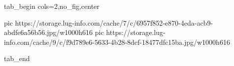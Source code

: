  
 
 
 
 


\ifcmt
  tab_begin cols=2,no_fig,center

     pic https://storage.lug-info.com/cache/7/c/6957f852-e870-4eda-acb9-abdfe6a56b56.jpg/w1000h616
		 pic https://storage.lug-info.com/cache/9/c/f9d789e6-5633-4b28-8dcf-18477dfc15ba.jpg/w1000h616

  tab_end
\fi
